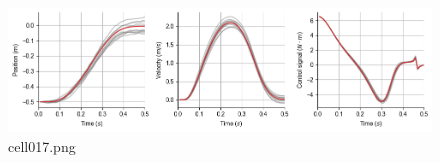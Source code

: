 \begin{figure}[ht]
	\centering
	\includegraphics[scale=0.8, max width=\linewidth]{./fig/motor-learning/local-learning-ofc/cell017.png}
	\caption{cell017.png}
	\label{cell017.png}
\end{figure}